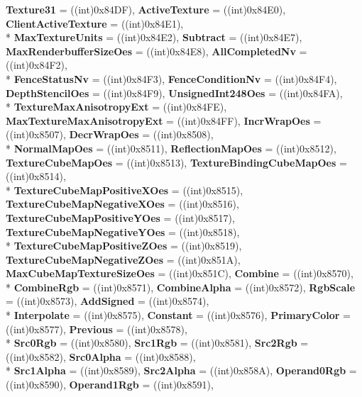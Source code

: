 \begin{DoxyCompactItemize}
{\bfseries Texture31} = ((int)0x84\-D\-F), 
{\bfseries Active\-Texture} = ((int)0x84\-E0), 
{\bfseries Client\-Active\-Texture} = ((int)0x84\-E1), 
\\*
{\bfseries Max\-Texture\-Units} = ((int)0x84\-E2), 
{\bfseries Subtract} = ((int)0x84\-E7), 
{\bfseries Max\-Renderbuffer\-Size\-Oes} = ((int)0x84\-E8), 
{\bfseries All\-Completed\-Nv} = ((int)0x84\-F2), 
\\*
{\bfseries Fence\-Status\-Nv} = ((int)0x84\-F3), 
{\bfseries Fence\-Condition\-Nv} = ((int)0x84\-F4), 
{\bfseries Depth\-Stencil\-Oes} = ((int)0x84\-F9), 
{\bfseries Unsigned\-Int248\-Oes} = ((int)0x84\-F\-A), 
\\*
{\bfseries Texture\-Max\-Anisotropy\-Ext} = ((int)0x84\-F\-E), 
{\bfseries Max\-Texture\-Max\-Anisotropy\-Ext} = ((int)0x84\-F\-F), 
{\bfseries Incr\-Wrap\-Oes} = ((int)0x8507), 
{\bfseries Decr\-Wrap\-Oes} = ((int)0x8508), 
\\*
{\bfseries Normal\-Map\-Oes} = ((int)0x8511), 
{\bfseries Reflection\-Map\-Oes} = ((int)0x8512), 
{\bfseries Texture\-Cube\-Map\-Oes} = ((int)0x8513), 
{\bfseries Texture\-Binding\-Cube\-Map\-Oes} = ((int)0x8514), 
\\*
{\bfseries Texture\-Cube\-Map\-Positive\-X\-Oes} = ((int)0x8515), 
{\bfseries Texture\-Cube\-Map\-Negative\-X\-Oes} = ((int)0x8516), 
{\bfseries Texture\-Cube\-Map\-Positive\-Y\-Oes} = ((int)0x8517), 
{\bfseries Texture\-Cube\-Map\-Negative\-Y\-Oes} = ((int)0x8518), 
\\*
{\bfseries Texture\-Cube\-Map\-Positive\-Z\-Oes} = ((int)0x8519), 
{\bfseries Texture\-Cube\-Map\-Negative\-Z\-Oes} = ((int)0x851\-A), 
{\bfseries Max\-Cube\-Map\-Texture\-Size\-Oes} = ((int)0x851\-C), 
{\bfseries Combine} = ((int)0x8570), 
\\*
{\bfseries Combine\-Rgb} = ((int)0x8571), 
{\bfseries Combine\-Alpha} = ((int)0x8572), 
{\bfseries Rgb\-Scale} = ((int)0x8573), 
{\bfseries Add\-Signed} = ((int)0x8574), 
\\*
{\bfseries Interpolate} = ((int)0x8575), 
{\bfseries Constant} = ((int)0x8576), 
{\bfseries Primary\-Color} = ((int)0x8577), 
{\bfseries Previous} = ((int)0x8578), 
\\*
{\bfseries Src0\-Rgb} = ((int)0x8580), 
{\bfseries Src1\-Rgb} = ((int)0x8581), 
{\bfseries Src2\-Rgb} = ((int)0x8582), 
{\bfseries Src0\-Alpha} = ((int)0x8588), 
\\*
{\bfseries Src1\-Alpha} = ((int)0x8589), 
{\bfseries Src2\-Alpha} = ((int)0x858\-A), 
{\bfseries Operand0\-Rgb} = ((int)0x8590), 
{\bfseries Operand1\-Rgb} = ((int)0x8591), 

\end{DoxyCompactItemize}
